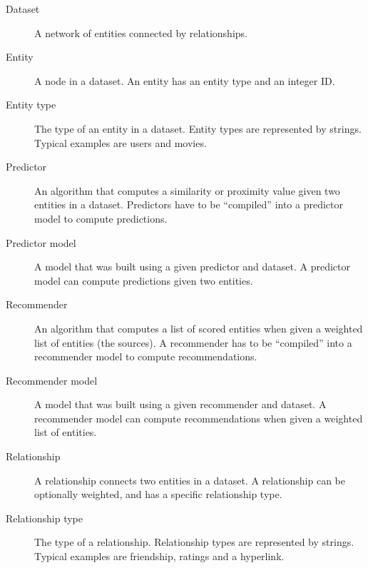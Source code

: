 \documentclass{article}
\begin{document}
\begin{description}

\item[Dataset]
A network of entities connected by relationships. 

\item[Entity]
A node in a dataset.  An entity has an entity type and an integer ID.  

\item[Entity type]
The type of an entity in a dataset.  Entity types are represented by
strings.  Typical examples are users and movies. 

\item[Predictor] 
An algorithm that computes a similarity or proximity value given two
entities in a dataset.  Predictors have to be ``compiled'' into a predictor
model to compute predictions. 

\item[Predictor model]
A model that was built using a given predictor and dataset.   A
predictor model can compute predictions given two entities. 

\item[Recommender]
An algorithm that computes a list of scored entities when given a
weighted list of entities (the sources).  A recommender has to be
``compiled'' into a recommender model to compute recommendations. 

\item[Recommender model]
A model that was built using a given recommender and dataset.  A
recommender model can compute recommendations when given a weighted list
of entities. 

\item[Relationship]
A relationship connects two entities in a dataset.  A relationship can be optionally
weighted, and has a specific relationship type. 

\item[Relationship type]
The type of a relationship.  Relationship types are represented by
strings.  Typical examples are friendship, ratings and a hyperlink. 

\end{description}

 

\end{document}

